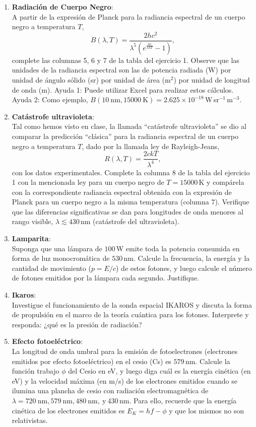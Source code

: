 \documentclass[a4paper,12pt]{article}
\begin{document}
\begin{enumerate}
\item {\bf{Radiación de Cuerpo Negro}}:\\
	A partir de la expresión de Planck para la radiancia espectral de un cuerpo
		negro a temperatura $T$, $$ B(\lambda, T) = \frac{2 h c^2}{\lambda^5
		\left (e^{\frac{hc}{\lambda k T}}-1 \right )},$$ complete las columnas
		5, 6 y 7 de la tabla del ejercicio 1. Observe que las unidades de la
		radiancia espectral son las de potencia radiada (W) por unidad de
		ángulo sólido (sr) por unidad de área (m$^2$) por unidad de longitud de
		onda (m). Ayuda 1: Puede utilizar Excel para realizar estos cálculos.
		Ayuda 2: Como ejemplo, $B(10\mathrm{\ nm}, 15000\mathrm{\ K}) = 2.625
		\times 10^{-18}$\,W\,sr$^{-1}$\,m$^{-3}$.

\item {\bf{Catástrofe ultravioleta}}:\\
	Tal como hemos visto en clase, la llamada ``catástrofe ultravioleta'' se
		dio al comparar la predicción ``clásica'' para la radiancia espectral
		de un cuerpo negro a temperatura $T$, dado por la llamada ley de
		Rayleigh-Jeans, $$ R(\lambda,T) = \frac{2 c k T}{\lambda^4},$$ con los
		datos experimentales. Complete la columna 8 de la tabla del ejercicio 1
		con la mencionada ley para un cuerpo negro de $T=15000$\,K y compárela
		con la correspondiente radiancia espectral obtenida con la expresión de
		Planck para un cuerpo negro a la misma temperatura (columna 7).
		Verifique que las diferencias significativas se dan para longitudes de
		onda menores al rango visible, $\lambda \lesssim 430$\,nm (catástrofe
		del ultravioleta).

\item {\bf{Lamparita}}:\\
	Suponga que una lámpara de $100$\,W emite toda la potencia consumida en
	forma de luz monocromática de $530$\,nm. Calcule la frecuencia, la energía
	y la cantidad de movimiento ($p=E/c$) de estos fotones, y luego calcule el
	número de fotones emitidos por la lámpara cada segundo. Justifique. 

\item {\bf{Ikaros}}:\\
	Investigue el funcionamiento de la sonda espacial IKAROS y discuta la forma
	de propulsión en el marco de la teoría cuántica para los fotones.
	Interprete y responda: ¿qué es la presión de radiación?

\item {\bf{Efecto fotoeléctrico}}:\\
	La longitud de onda umbral para la emisión de fotoelectrones (electrones
	emitidos por efecto fotoeléctrico) en el cesio (Cs) es $579$\,nm. Calcule
	la función trabajo $\phi$ del Cesio en eV, y luego diga cuál es la energía
	cinética (en eV) y la velocidad máxima (en m/s) de los electrones emitidos
	cuando se ilumina una plancha de cesio con radiación electromagnética de
	$\lambda = 720\mathrm{\ nm}, 579\mathrm{\ nm}, 480\mathrm{\ nm,\ y\ }
	430$\,nm. Para ello, recuerde que la energía cinética de los electrones
	emitidos es $E_K = h f - \phi$ y que los mismos no son relativistas.  


\end{enumerate}
\end{document}
